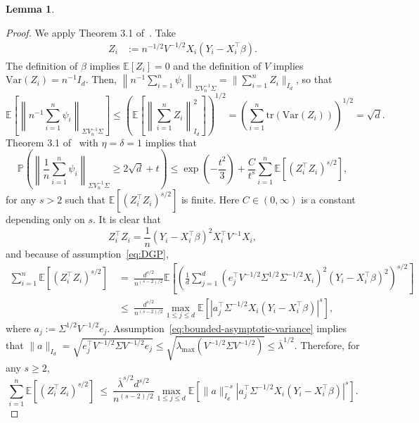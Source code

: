 \documentclass[11pt]{article}
\newtheorem{lemma}[theorem]{Lemma}
\begin{document}
\begin{appendices}
\begin{lemma}
\[\]
\end{lemma}
\begin{proof}
We apply Theorem 3.1 of~\cite{einmahl2008characterization}. Take 
\begin{align*}
Z_i &:= 
n^{-1/2}V^{-1/2}X_i(Y_i - X_i^{\top}\beta).
\end{align*}
The definition of $\beta$ implies $\mathbb{E}[Z_i] = 0$ and the definition of $V$ implies $\mbox{Var}(Z_i) = n^{-1}I_d$. Then, $\left\|{n}^{-1}\sum_{i=1}^n \psi_i\right\|_{\Sigma V^{-1}_n\Sigma} = \| \sum_{i=1}^n Z_i\|_{I_d} $, so that
\[\textstyle
\mathbb{E}\left[\left\|{n}^{-1}\sum_{i=1}^n \psi_i\right\|_{\Sigma V^{-1}_n\Sigma}\right] \le \left(\mathbb{E}\left[\left\|\sum_{i=1}^n Z_i\right\|_{I_d}^2\right]\right)^{1/2} = \left(\sum_{i=1}^n \mbox{tr}(\mbox{Var}(Z_i))\right)^{1/2} = \sqrt{d}.
\]
Theorem 3.1 of~\cite{einmahl2008characterization} with $\eta = \delta = 1$ implies that
\begin{equation}\label{eq:tail-inequality-influence}
\mathbb{P}\left(\left\|\frac{1}{n}\sum_{i=1}^n \psi_i\right\|_{\Sigma V^{-1}_n\Sigma} \ge 2\sqrt{d} + t\right) \le \exp\left(-\frac{t^2}{3}\right) + \frac{C}{t^s}\sum_{i=1}^n \mathbb{E}[(Z_i^{\top}Z_i)^{s/2}], 
\end{equation}
for any $s > 2$ such that $\mathbb{E}[(Z_i^{\top}Z_i)^{s/2}]$ is finite. Here $C\in(0, \infty)$ is a constant depending only on $s$. It is clear that
\[
Z_i^{\top}Z_i = \frac{1}{n}(Y_i - X_i^{\top}\beta)^2X_i^{\top}V^{-1}X_i,
\]
and because of assumption~\ref{eq:DGP},
\begin{align*}
\sum_{i=1}^n \mathbb{E}[(Z_i^{\top}Z_i)^{s/2}] ~&=~ \frac{d^{s/2}}{n^{(s-2)/2}}\mathbb{E}\left[\left(\frac{1}{d}\sum_{j=1}^d (e_j^{\top}V^{-1/2}\Sigma^{1/2}\Sigma^{-1/2}X_i)^2(Y_i - X_i^{\top}\beta)^2\right)^{s/2}\right]\\
~&\le~ \frac{d^{s/2}}{n^{(s-2)/2}}\max_{1\le j\le d} \mathbb{E}\left[|a_j^{\top}\Sigma^{-1/2}X_i(Y_i - X_i^{\top}\beta)|^s\right],
\end{align*}
where $a_j := \Sigma^{1/2}V^{-1/2}e_j$. Assumption~\ref{eq:bounded-asymptotic-variance} implies that $\|a\|_{I_d} = \sqrt{e_j^{\top}V^{-1/2}\Sigma V^{-1/2}e_j} \le \sqrt{\lambda_{\max}(V^{-1/2}\Sigma V^{-1/2})} \le \overline{\lambda}^{1/2}$. Therefore, for any $s \ge 2$,
\[
\sum_{i=1}^n \mathbb{E}[(Z_i^{\top}Z_i)^{s/2}] ~\le~ \frac{\overline{\lambda}^{s/2}d^{s/2}}{n^{(s-2)/2}}\max_{1\le j\le d}\mathbb{E}\left[\|a\|_{I_d}^{-s}|a_j^{\top}\Sigma^{-1/2}X_i(Y_i - X_i^{\top}\beta)|^s\right].
\]
\end{proof}
\end{appendices}
\end{document}
